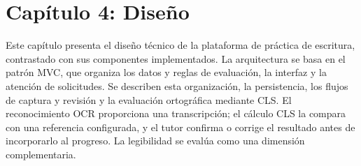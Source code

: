﻿\section{Capítulo 4: Diseño}

Este capítulo presenta el diseño técnico de la plataforma de práctica de escritura, contrastado con sus componentes implementados. La arquitectura se basa en el patrón MVC, que organiza los datos y reglas de evaluación, la interfaz y la atención de solicitudes. Se describen esta organización, la persistencia, los flujos de captura y revisión y la evaluación ortográfica mediante CLS. El reconocimiento OCR proporciona una transcripción; el cálculo CLS la compara con una referencia configurada, y el tutor confirma o corrige el resultado antes de incorporarlo al progreso. La legibilidad se evalúa como una dimensión complementaria.

\begingroup
\sloppy







\par
\endgroup
